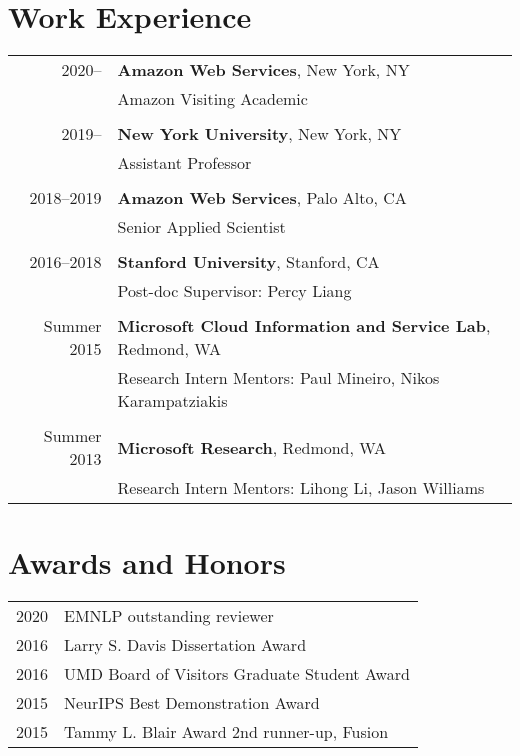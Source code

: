 \documentclass[a4paper,11pt]{article}
\begin{document}
\section{Work Experience}
\begin{tabular}{rl}    
2020--   & \textbf{Amazon Web Services}, New York, NY \\
    & Amazon Visiting Academic \\
\\
2019--   & \textbf{New York University}, New York, NY \\
    & Assistant Professor \\
\\
2018--2019  & \textbf{Amazon Web Services}, Palo Alto, CA \\
    & Senior Applied Scientist \\
\\
2016--2018 & \textbf{Stanford University}, Stanford, CA\\
& Post-doc \hspace{2em} Supervisor: Percy Liang \\
\\
Summer 2015 & {\bf Microsoft Cloud Information and Service Lab}, Redmond, WA\\
& Research Intern \hspace{2em} Mentors: Paul Mineiro, Nikos Karampatziakis\\
\\
Summer 2013 & {\bf Microsoft Research}, Redmond, WA\\
& Research Intern \hspace{2em} Mentors: Lihong Li, Jason Williams
\end{tabular}

\section{Awards and Honors}
\begin{tabular}{rl}    
2020 & EMNLP outstanding reviewer \\
2016 & Larry S. Davis Dissertation Award\\
2016 & UMD Board of Visitors Graduate Student Award\\
2015 & NeurIPS Best Demonstration Award\\
2015 & Tammy L. Blair Award 2nd runner-up, Fusion\\
\end{tabular}
\end{document}
